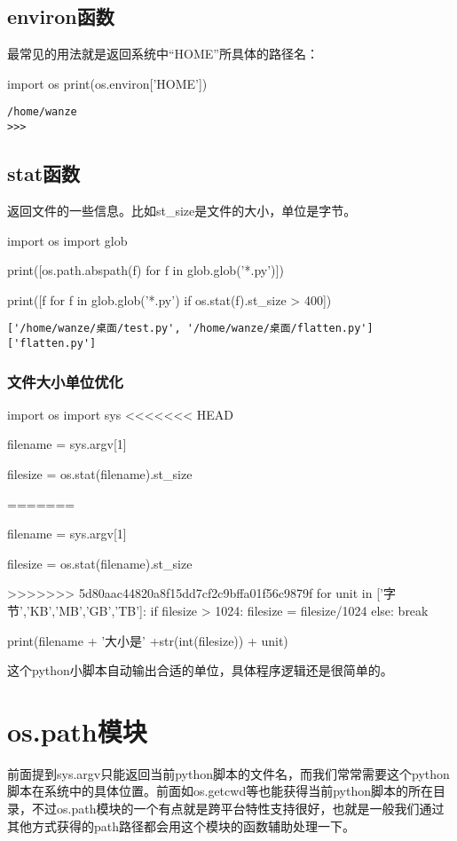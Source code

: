 \documentclass[12pt,oneside]{book}
\begin{document}
\begin{common-format}
\section{environ函数}
最常见的用法就是返回系统中“HOME”所具体的路径名：
\begin{tcbpython}[]
import os
print(os.environ['HOME'])
\end{tcbpython}
\begin{Verbatim}
/home/wanze
>>> 
\end{Verbatim}

\section{stat函数}
返回文件的一些信息。比如st\_{}size是文件的大小，单位是字节。

\begin{tcbpython}[]
import os
import glob

print([os.path.abspath(f) for f in glob.glob('*.py')])

print([f for f in glob.glob('*.py') if os.stat(f).st_size > 400])
\end{tcbpython}
\begin{Verbatim}
['/home/wanze/桌面/test.py', '/home/wanze/桌面/flatten.py']
['flatten.py']
\end{Verbatim}

\subsection{文件大小单位优化}
\begin{tcbpython}[]
import os
import sys
<<<<<<< HEAD

filename = sys.argv[1]

filesize = os.stat(filename).st_size

=======

filename = sys.argv[1]

filesize = os.stat(filename).st_size

>>>>>>> 5d80aac44820a8f15dd7cf2c9bffa01f56c9879f
for unit in ['字节','KB','MB','GB','TB']:
    if filesize > 1024:
        filesize = filesize/1024
    else:
        break

print(filename + '大小是' +str(int(filesize)) + unit)
\end{tcbpython}
这个python小脚本自动输出合适的单位，具体程序逻辑还是很简单的。

\chapter{os.path模块}
前面提到sys.argv只能返回当前python脚本的文件名，而我们常常需要这个python脚本在系统中的具体位置。前面如os.getcwd等也能获得当前python脚本的所在目录，不过os.path模块的一个有点就是跨平台特性支持很好，也就是一般我们通过其他方式获得的path路径都会用这个模块的函数辅助处理一下。


\end{common-format}
\end{document}

